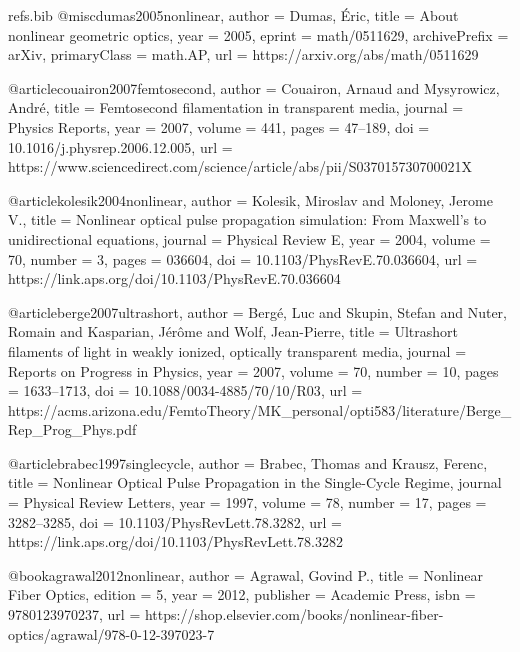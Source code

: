\begin{filecontents*}{refs.bib}
@misc{dumas2005nonlinear,
  author = {Dumas, Éric},
  title  = {About nonlinear geometric optics},
  year   = {2005},
  eprint = {math/0511629},
  archivePrefix = {arXiv},
  primaryClass = {math.AP},
  url    = {https://arxiv.org/abs/math/0511629}
}

@article{couairon2007femtosecond,
  author  = {Couairon, Arnaud and Mysyrowicz, André},
  title   = {Femtosecond filamentation in transparent media},
  journal = {Physics Reports},
  year    = {2007},
  volume  = {441},
  pages   = {47--189},
  doi     = {10.1016/j.physrep.2006.12.005},
  url     = {https://www.sciencedirect.com/science/article/abs/pii/S037015730700021X}
}

@article{kolesik2004nonlinear,
  author  = {Kolesik, Miroslav and Moloney, Jerome V.},
  title   = {Nonlinear optical pulse propagation simulation: From Maxwell’s to unidirectional equations},
  journal = {Physical Review E},
  year    = {2004},
  volume  = {70},
  number  = {3},
  pages   = {036604},
  doi     = {10.1103/PhysRevE.70.036604},
  url     = {https://link.aps.org/doi/10.1103/PhysRevE.70.036604}
}

@article{berge2007ultrashort,
  author  = {Bergé, Luc and Skupin, Stefan and Nuter, Romain and Kasparian, Jér{\^o}me and Wolf, Jean-Pierre},
  title   = {Ultrashort filaments of light in weakly ionized, optically transparent media},
  journal = {Reports on Progress in Physics},
  year    = {2007},
  volume  = {70},
  number  = {10},
  pages   = {1633--1713},
  doi     = {10.1088/0034-4885/70/10/R03},
  url     = {https://acms.arizona.edu/FemtoTheory/MK_personal/opti583/literature/Berge_Rep_Prog_Phys.pdf}
}

@article{brabec1997singlecycle,
  author  = {Brabec, Thomas and Krausz, Ferenc},
  title   = {Nonlinear Optical Pulse Propagation in the Single-Cycle Regime},
  journal = {Physical Review Letters},
  year    = {1997},
  volume  = {78},
  number  = {17},
  pages   = {3282--3285},
  doi     = {10.1103/PhysRevLett.78.3282},
  url     = {https://link.aps.org/doi/10.1103/PhysRevLett.78.3282}
}

@book{agrawal2012nonlinear,
  author    = {Agrawal, Govind P.},
  title     = {Nonlinear Fiber Optics},
  edition   = {5},
  year      = {2012},
  publisher = {Academic Press},
  isbn      = {9780123970237},
  url       = {https://shop.elsevier.com/books/nonlinear-fiber-optics/agrawal/978-0-12-397023-7}
}
\end{filecontents*}

